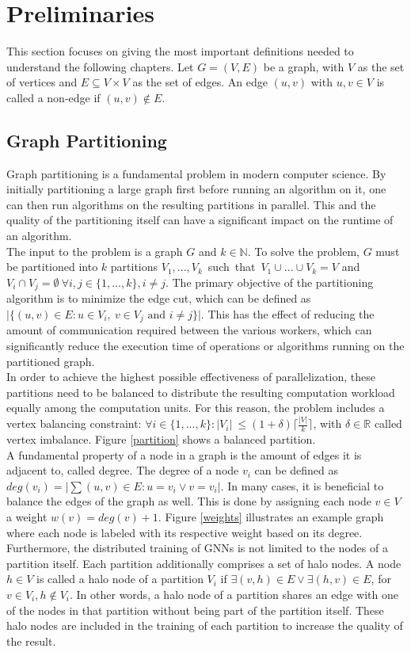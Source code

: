 \documentclass[acmsmall,nonacm,screen,review]{acmart}
\begin{document}
\section{Preliminaries}
This section focuses on giving the most important definitions needed to understand the following chapters. Let $G=(V,E)$ be a graph, with $V$ as the set of vertices and $E \subseteq V \times V$ as the set of edges. An edge $(u,v)$ with $u,v \in V$ is called a non-edge if $(u,v) \notin E$.
\subsection{Graph Partitioning}
Graph partitioning is a fundamental problem in modern computer science. By initially partitioning a large graph first before running an algorithm on it, one can then run algorithms on the resulting partitions in parallel. This and the quality of the partitioning itself can have a significant impact on the runtime of an algorithm. \\ 
The input to the problem is a graph $G$ and $k\in \mathbb{N}$. To solve the problem, $G$ must be partitioned into $k$ partitions \hbox{$V_{1},...,V_{k}$ such that $V_{1}\cup...\cup V_{k} = V$} and $V_{i}\cap V_{j} = \emptyset\ \forall i,j\in \{1,...,k\}, i \neq j$. The primary objective of the partitioning algorithm is to minimize the edge cut, which can be defined as $\vert \{(u,v)\in E : u\in V_{i},\ v\in V_{j} \text{ and } i\neq j \}\vert$. This has the effect of reducing the amount of communication required between the various workers, which can significantly reduce the execution time of operations or algorithms running on the partitioned graph.  \\
In order to achieve the highest possible effectiveness of parallelization, these partitions need to be balanced to distribute the resulting computation workload equally among the computation units. For this reason, the problem includes a vertex balancing constraint: $\forall i\in \{1,...,k\} : \vert V_{i}\vert \ \leq (1 + \delta) \lceil \frac{\vert V \vert }{k} \rceil $, with $\delta \in \mathbb{R}$ called vertex imbalance. Figure \ref{partition} shows a balanced partition. \\
A fundamental property of a node in a graph is the amount of edges it is adjacent to, called degree. The degree of a node $v_{i}$ can be defined as $deg(v_{i}) = \vert\sum{(u,v)\in E : u = v_{i} \vee v = v_{i}}\vert$. 
In many cases, it is beneficial to balance the edges of the graph as well. This is done by assigning each node $v \in V$ a weight $w(v) = deg(v) + 1$. Figure \ref{weights} illustrates an example graph where each node is labeled with its respective weight based on its degree. \\
Furthermore, the distributed training of GNNs is not limited to the nodes of a partition itself. Each partition additionally comprises a set of halo nodes. A node $h \in V$ is called a halo node of a partition $V_{i}$ if $\exists (v,h) \in E \vee \exists (h,v) \in E$, for $v \in V_{i}, h \notin V_{i}$. In other words, a halo node of a partition shares an edge with one of the nodes in that partition without being part of the partition itself. These halo nodes are included in the training of each partition to increase the quality of the result. 
\end{document}
